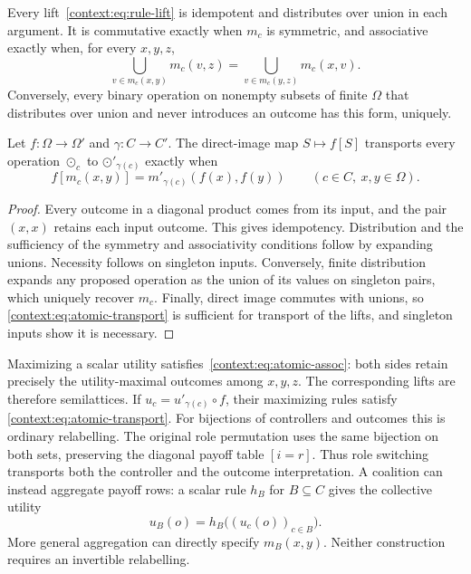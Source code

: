 \begin{proposition}\label{context:prop:rule-lift}
Every lift~\eqref{context:eq:rule-lift} is idempotent and distributes
over union in each argument. It is commutative exactly when $m_c$ is
symmetric, and associative exactly when, for every $x,y,z$,
\begin{equation}\label{context:eq:atomic-assoc}
 \bigcup_{v\in m_c(x,y)}m_c(v,z)
 =\bigcup_{v\in m_c(y,z)}m_c(x,v).
\end{equation}
Conversely, every binary operation on nonempty subsets of finite
$\Omega$ that distributes over union and never introduces an outcome
has this form, uniquely.

Let $f:\Omega\to\Omega'$ and $\gamma:C\to C'$. The direct-image
map $S\mapsto f[S]$ transports every operation $\odot_c$ to
$\odot'_{\gamma(c)}$ exactly when
\begin{equation}\label{context:eq:atomic-transport}
 f[m_c(x,y)]=m'_{\gamma(c)}(f(x),f(y))
 \qquad(c\in C,\ x,y\in\Omega).
\end{equation}
\end{proposition}
\begin{proof}
Every outcome in a diagonal product comes from its input, and the
pair $(x,x)$ retains each input outcome. This gives idempotency.
Distribution and the sufficiency of the symmetry and associativity
conditions follow by expanding unions. Necessity follows on singleton
inputs. Conversely, finite distribution expands any proposed operation
as the union of its values on singleton pairs, which uniquely recover
$m_c$. Finally, direct image commutes with unions, so
\eqref{context:eq:atomic-transport} is sufficient for transport of the
lifts, and singleton inputs show it is necessary.
\end{proof}

Maximizing a scalar utility satisfies~\eqref{context:eq:atomic-assoc}:
both sides retain precisely the utility-maximal outcomes among
$x,y,z$. The corresponding lifts are therefore semilattices.
If $u_c=u'_{\gamma(c)}\circ f$, their maximizing rules satisfy
\eqref{context:eq:atomic-transport}. For bijections of controllers and
outcomes this is ordinary relabelling. The original role permutation
uses the same bijection on both sets, preserving the diagonal payoff
table $[i=r]$. Thus role switching transports both the controller and
the outcome interpretation. A coalition can instead aggregate payoff
rows: a scalar rule $h_B$ for $B\subseteq C$ gives the collective utility
\[
 u_B(o)=h_B\bigl((u_c(o))_{c\in B}\bigr).
\]
More general aggregation can directly specify $m_B(x,y)$. Neither
construction requires an invertible relabelling.


